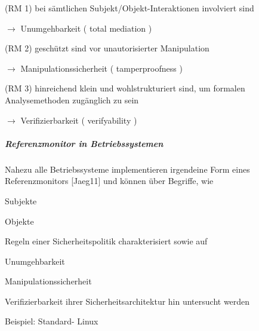 \documentclass[a4paper]{article}
\begin{document}
\begin{multicols}{3}
    \begin{itemize*}
        \item
        (RM 1) bei sämtlichen Subjekt/Objekt-Interaktionen involviert sind
        \begin{itemize*}
            \item $\rightarrow$ Unumgehbarkeit ( total mediation )
        \end{itemize*}
        \item
        (RM 2) geschützt sind vor unautorisierter Manipulation
        \begin{itemize*}
            \item $\rightarrow$ Manipulationssicherheit ( tamperproofness )
        \end{itemize*}
        \item
        (RM 3) hinreichend klein und wohlstrukturiert sind, um formalen
        Analysemethoden zugänglich zu sein
        \begin{itemize*}
            \item $\rightarrow$ Verifizierbarkeit ( verifyability )
        \end{itemize*}
    \end{itemize*}


    \subparagraph{Referenzmonitor in
        Betriebssystemen}

    Nahezu alle Betriebssysteme implementieren irgendeine Form eines
    Referenzmonitors {[}Jaeg11{]} und können über Begriffe, wie

    \begin{itemize*}
        \item
        Subjekte
        \item
        Objekte
        \item
        Regeln einer Sicherheitspolitik charakterisiert sowie auf
        \item
        Unumgehbarkeit
        \item
        Manipulationssicherheit
        \item
        Verifizierbarkeit ihrer Sicherheitsarchitektur hin untersucht werden
    \end{itemize*}

    Beispiel: Standard- Linux


\end{multicols}
\end{document}
